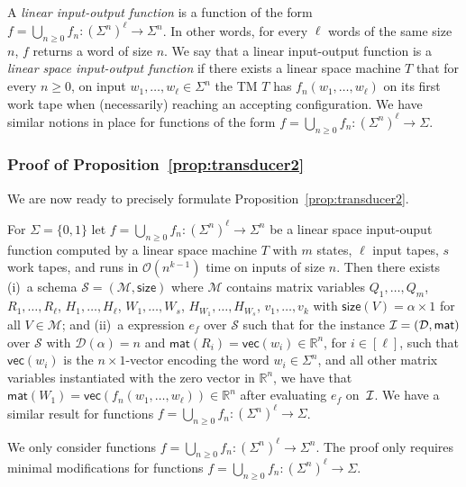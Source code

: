  A \textit{linear input-output function} is a function of the form 
$f=\bigcup_{n\geq 0} f_n:(\Sigma^n)^\ell\to\Sigma^n$. In other words, for every $\ell$ words of the same 
size $n$, $f$ returns a word of size $n$. We say that a linear input-output function is a 
\textit{linear space input-output function} if
there exists a linear space machine  $T$ that for every $n\geq 0$, on input $w_1,\ldots,w_\ell\in\Sigma^n$ 
the TM $T$ has
$f_n(w_1,\ldots,w_\ell)$ on its first work tape when (necessarily) reaching an accepting configuration.
We have similar notions in place for functions of the form $f=\bigcup_{n\geq 0} f_n:(\Sigma^n)^\ell\to\Sigma$.

\subsubsection{Proof of Proposition~\ref{prop:transducer2}}
We are now ready to precisely formulate  Proposition~\ref{prop:transducer2}.

\begin{proposition}
	For $\Sigma = \{0,1\}$ let $f=\bigcup_{n\geq 0}f_n:(\Sigma^n)^\ell\to \Sigma^n$ be a linear space input-ouput function 
	computed by a linear space  machine $T$ with $m$ states, $\ell$ input tapes, $s$ work tapes, and runs in $\mathcal{O}(n^{k-1})$ time on inputs of size $n$. 
	Then there exists (i)~a \langfor 
	schema $\mathcal{S}=(\mathcal{M},\textsf{size})$ where $\mathcal{M}$ contains matrix 
	variables
	$Q_1,\ldots,Q_m$, $R_1,\ldots,R_\ell$, $H_1,\ldots,H_\ell$, $W_1,\ldots,W_s$, $H_{W_1},\ldots,H_{W_s}$, $v_1,\ldots,v_{k}$  
	with $\mathsf{size}(V)=\alpha\times 1$ for all $V\in\mathcal{M}$; and (ii)~a \langfor 
	expression $e_f$ over $\mathcal{S}$ such that for the instance 
	$\mathcal{I}=(\mathcal{D},\textsf{mat})$ over $\mathcal{S}$ with $\mathcal{D}(\alpha)=n$ and 
	$\mathsf{mat}(R_i)=\mathsf{vec}(w_i)\in \mathbb{R}^n$, for $i\in[\ell]$, such that $\mathsf{vec}(w_i)$ is the $n\times 1$-vector 
	encoding the word $w_i\in\Sigma^n$, and all other matrix variables instantiated with the zero vector in $\mathbb{R}^n$,  we have that  $\mathsf{mat}(W_1)=\mathsf{vec}(f_n(w_1,\ldots,w_\ell))\in\mathbb{R}^n$ 
	after evaluating $e_f$ on~$\mathcal{I}$. We have a similar result for functions $f=\bigcup_{n\geq 0}f_n:(\Sigma^n)^\ell\to \Sigma$.
\end{proposition}

We only consider functions $f=\bigcup_{n\geq 0}f_n:(\Sigma^n)^\ell\to \Sigma^n$. The proof only requires
minimal modifications for functions  $f=\bigcup_{n\geq 0}f_n:(\Sigma^n)^\ell\to \Sigma$.

